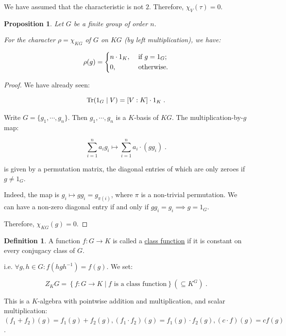 \documentclass{article}
\theoremstyle{definition}
\newtheorem*{definition}{Definition}
\theoremstyle{plain}
\newtheorem{proposition}[theorem]{Proposition}
\theoremstyle{remark}
\begin{document}
    We have assumed that the characteristic is not \(2\). Therefore, \(\chi_V(\tau) = 0\).

    \begin{proposition}
        Let \(G\) be a finite group of order \(n\).

        For the character \(\rho = \chi_{KG}\) of \(G\) on \(KG\) (by left multiplication), we have:

        \[
            \rho(g) = \begin{dcases}
                n \cdot 1_K, &\text{ if } g = 1_G ;\\
                0, &\text{ otherwise} .
            \end{dcases}
        \]
    \end{proposition}    

    \begin{proof}
        We have already seen:

        \[
            \Tr(1_G \mid V) = [V:K] \cdot 1_K\;.
        \]

        Write \(G = \{ g_1 , \cdots , g_n \}\). Then \(g_1 , \cdots , g_n\) is a \(K\)-basis of \(KG\). The multiplication-by-\(g\) map:

        \[
            \sum_{i=1}^n a_i g_i \mapsto \sum_{i=1}^n a_i \cdot (g g_i)\;.
        \]

        is given by a permutation matrix, the diagonal entries of which are only zeroes if \(g \neq 1_G\).

        Indeed, the map is \(g_i \mapsto g g_i = g_{\pi(i)}\), where \(\pi\) is a non-trivial permutation. We can have a non-zero diagonal entry if and only if \(g g_i = g_i \implies g = 1_G\).
        
        Therefore, \(\chi_{KG}(g) = 0\).

    \end{proof}

    \begin{definition}
        A function \(f: G \to K\) is called a \underline{class function} if it is constant on every conjugacy class of \(G\).

        i.e. \(\forall g,h \in G: f(hgh ^{-1}) = f(g)\). We set:

        \[
            Z_K G = \left\{ f: G \to K \mid f \text{ is a class function}  \right\} \left( \subseteq K^G \right)\;.
        \]

        This is a \(K\)-algebra with pointwise addition and multiplication, and scalar multiplication: \((f_1 + f_2)(g) = f_1(g) + f_2(g), (f_1 \cdot f_2)(g) = f_1(g) \cdot f_2(g), (c \cdot f)(g) = cf(g)\).

    \end{definition}
\end{document}
